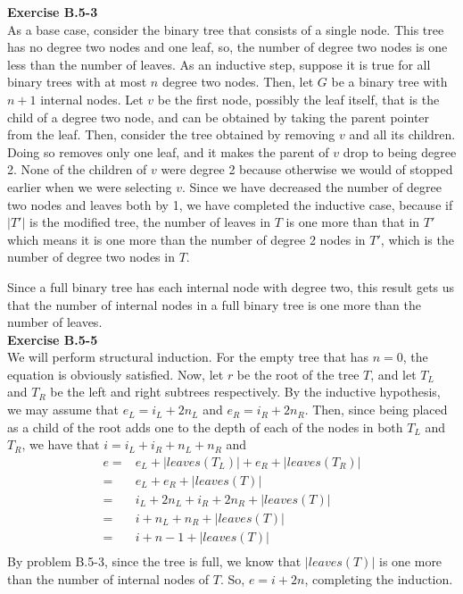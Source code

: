 \documentclass{article}
\begin{document}
\noindent\textbf{Exercise B.5-3}\\
As a base case, consider the binary tree that consists of a single node. This tree has no degree two nodes and one leaf, so, the number of degree two nodes is one less than the number of leaves. As an inductive step, suppose it is true for all binary trees with at most $n$ degree two nodes. Then, let $G$ be a binary tree with $n+1$ internal nodes. Let $v$ be the first node, possibly the leaf itself, that is the child of a degree two node, and can be obtained by taking the parent pointer from the leaf. Then, consider the tree obtained by removing $v$ and all its children. Doing so removes only one leaf, and it makes the parent of $v$ drop to being degree 2. None of the children of $v$ were degree 2 because otherwise we would of stopped earlier when we were selecting $v$. Since we have decreased the number of degree two nodes and leaves both by 1, we have completed the inductive case, because if $|T'|$ is the modified tree, the number of leaves in $T$ is one more than that in $T'$ which means it is one more than the number of degree 2 nodes in $T'$, which is the number of degree two nodes in $T$.

Since a full binary tree has each internal node with degree two, this result gets us that the number of internal nodes in a full binary tree is one more than the number of leaves.\\

\noindent\textbf{Exercise B.5-5}\\
We will perform structural induction. For the empty tree that has $n=0$, the equation is obviously satisfied. Now, let $r$ be the root of the tree $T$, and let $T_L$ and $T_R$ be the left and right subtrees respectively. By the inductive hypothesis, we may assume that $e_L = i_L + 2n_L$ and $e_R = i_R + 2 n_R$. Then, since being placed as a child of the root adds one to the depth of each of the nodes in both $T_L$ and $T_R$, we have that $i = i_L + i_R + n_L+n_R$ and 
\begin{align*}
e =& e_L + |leaves(T_L)| + e_R +|leaves(T_R)| \\
=& e_L + e_R + |leaves(T)| \\
=& i_L + 2 n_L + i_R + 2n_R + |leaves(T)| \\
=& i + n_L + n_R + |leaves(T)| \\
=& i + n-1 + |leaves(T)| \\
\end{align*}
 By problem B.5-3, since the tree is full, we know that $|leaves(T)|$ is one more than the number of internal nodes of $T$. So, $e =  i+ 2n$, completing the induction.\\
\end{document}
